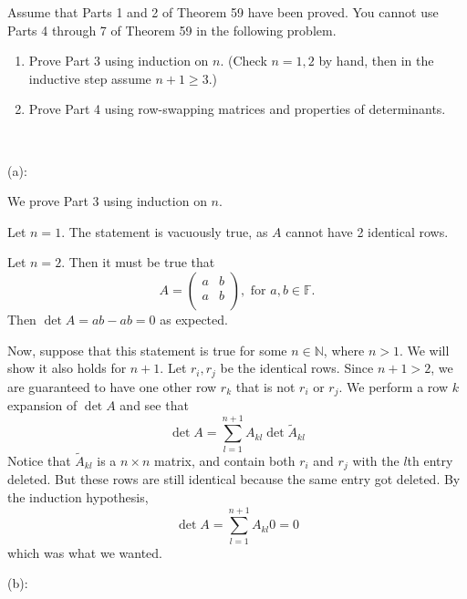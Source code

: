 \documentclass{eh-homework}
\begin{document}
    \begin{question}{4}
    Assume that Parts 1 and 2 of Theorem 59 have been proved. You cannot use Parts 4 through 7 of Theorem 59 in the following problem.
    
    \begin{enumerate}[label=(\alph*)]
        \item Prove Part 3 using induction on $n$. (Check $n = 1, 2$ by hand, then in the inductive step assume $n+1 \ge 3$.)
        \item Prove Part 4 using row-swapping matrices and properties of determinants.
    \end{enumerate}
    \tcblower
    \ 

    (a):

    We prove Part 3 using induction on \(n\).

    Let \(n = 1\). The statement is vacuously true, as \(A\) cannot have 2 identical rows.

    Let \(n = 2\). Then it must be true that
    \[
        A = \begin{pmatrix}
            a &  b \\
            a &  b \\
        \end{pmatrix}, \text{ for } a,b \in \mathbb{F}.
    \]
    Then \(\det A = ab - ab = 0\) as expected.

    Now, suppose that this statement is true for some \(n \in \mathbb{N}\), where \(n > 1\). We will show it also holds for \(n + 1\). Let \(r_i,r_j\) be the identical rows. Since \(n + 1 > 2\), we are guaranteed to have one other row \(r_k\) that is not \(r_i\) or \(r_j\). We perform a row \(k\) expansion of \(\det A\) and see that
    \[
        \det A = \sum_{l=1}^{n + 1} A_{kl} \det \tilde{A}_{kl}
    \]
    Notice that \(\tilde{A}_{kl}\) is a \(n\times n\) matrix, and contain both \(r_i\) and \(r_j\) with the \(l\)th entry deleted. But these rows are still identical because the same entry got deleted. By the induction hypothesis,
    \[
        \det A = \sum_{l=1}^{n + 1} A_{kl} 0 = 0
    \]
    which was what we wanted.

    \bigskip

    (b):


\end{question}
\end{document}
